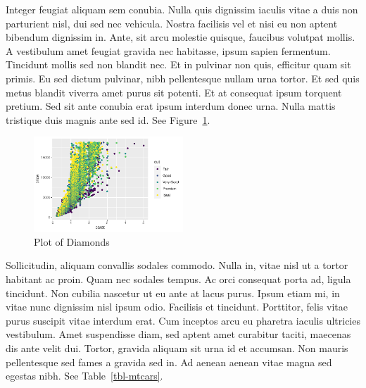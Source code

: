 \documentclass[
  9pt,
  letterpaper,
  DIV=11,
  numbers=noendperiod]{scrartcl}
\begin{document}
Integer feugiat aliquam sem conubia. Nulla quis dignissim iaculis vitae
a duis non parturient nisl, dui sed nec vehicula. Nostra facilisis vel
et nisi eu non aptent bibendum dignissim in. Ante, sit arcu molestie
quisque, faucibus volutpat mollis. A vestibulum amet feugiat gravida nec
habitasse, ipsum sapien fermentum. Tincidunt mollis sed non blandit nec.
Et in pulvinar non quis, efficitur quam sit primis. Eu sed dictum
pulvinar, nibh pellentesque nullam urna tortor. Et sed quis metus
blandit viverra amet purus sit potenti. Et at consequat ipsum torquent
pretium. Sed sit ante conubia erat ipsum interdum donec urna. Nulla
mattis tristique duis magnis ante sed id. See Figure~\ref{fig-diamonds}.

\begin{figure}

{\centering \includegraphics[width=0.5\textwidth,height=\textheight]{man_files/figure-pdf/fig-diamonds-1.pdf}

}

\caption{\label{fig-diamonds}Plot of Diamonds}

\end{figure}

Sollicitudin, aliquam convallis sodales commodo. Nulla in, vitae nisl ut
a tortor habitant ac proin. Quam nec sodales tempus. Ac orci consequat
porta ad, ligula tincidunt. Non cubilia nascetur ut eu ante at lacus
purus. Ipsum etiam mi, in vitae nunc dignissim nisl ipsum odio.
Facilisis et tincidunt. Porttitor, felis vitae purus suscipit vitae
interdum erat. Cum inceptos arcu eu pharetra iaculis ultricies
vestibulum. Amet suspendisse diam, sed aptent amet curabitur taciti,
maecenas dis ante velit dui. Tortor, gravida aliquam sit urna id et
accumsan. Non mauris pellentesque sed fames a gravida sed in. Ad aenean
aenean vitae magna sed egestas nibh. See Table~\ref{tbl-mtcars}.
\end{document}
